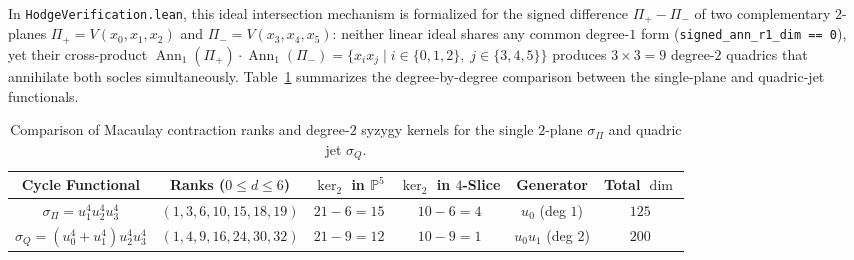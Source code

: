\documentclass[11pt,a4paper]{article}
\begin{document}
In \texttt{HodgeVerification.lean}, this ideal intersection mechanism is formalized for the signed difference $\Pi_+ - \Pi_-$ of two complementary $2$-planes $\Pi_+ = V(x_0, x_1, x_2)$ and $\Pi_- = V(x_3, x_4, x_5)$: neither linear ideal shares any common degree-$1$ form (\texttt{signed\_ann\_r1\_dim == 0}), yet their cross-product $\operatorname{Ann}_1(\Pi_+) \cdot \operatorname{Ann}_1(\Pi_-) = \{x_i x_j \mid i \in \{0,1,2\},\; j \in \{3,4,5\}\}$ produces $3 \times 3 = 9$ degree-$2$ quadrics that annihilate both socles simultaneously. Table~\ref{tab:syzygy_compare} summarizes the degree-by-degree comparison between the single-plane and quadric-jet functionals.

\begin{table}[htbp]
  \centering
  \small
  \setlength{\tabcolsep}{4pt}
  \caption{Comparison of Macaulay contraction ranks and degree-$2$ syzygy kernels for the single $2$-plane $\sigma_\Pi$ and quadric jet $\sigma_Q$.}
  \label{tab:syzygy_compare}
  \begin{tabular}{cccccc}
    \toprule
    Cycle Functional & Ranks ($0 \le d \le 6$) & $\ker_2$ in $\mathbb{P}^5$ & $\ker_2$ in $4$-Slice & Generator & Total $\dim$ \\
    \midrule
    $\sigma_\Pi = u_1^4 u_2^4 u_3^4$ & $(1, 3, 6, 10, 15, 18, 19)$ & $21 - 6 = 15$ & $10 - 6 = 4$ & $u_0$ (deg $1$) & $125$ \\
    $\sigma_Q = (u_0^4 + u_1^4)u_2^4 u_3^4$ & $(1, 4, 9, 16, 24, 30, 32)$ & $21 - 9 = 12$ & $10 - 9 = 1$ & $u_0 u_1$ (deg $2$) & $200$ \\
    \bottomrule
  \end{tabular}
\end{table}
\end{document}
